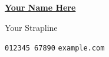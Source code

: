 \documentclass[10pt, oneside, final]{article}
\begin{document}
	\thispagestyle{empty}

	\centerline{\underline{\large\textbf{Your Name Here}}}
	\centerline{Your Strapline}

	\vfill
	\texttt{012345 67890}\hfill
	\texttt{example.com}\hfill
\end{document}

